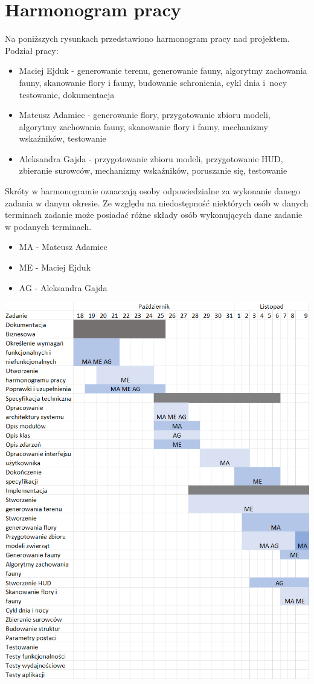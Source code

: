 \chapter{Harmonogram pracy}

Na poniższych rysunkach przedstawiono harmonogram pracy nad projektem. 
Podział pracy:
\begin{itemize}
    \item Maciej Ejduk - generowanie terenu, generowanie fauny, algorytmy zachowania fauny, skanowanie flory i fauny, budowanie schronienia, cykl dnia i~nocy testowanie, dokumentacja
    \item Mateusz Adamiec - generowanie flory, przygotowanie zbioru modeli, algorytmy zachowania fauny, skanowanie flory i fauny, mechanizmy wskaźników, testowanie
    \item Aleksandra Gajda - przygotowanie zbioru modeli, przygotowanie HUD, zbieranie surowców, mechanizmy wskaźników, poruszanie się, testowanie
\end{itemize}
Skróty w harmonogramie oznaczają osoby odpowiedzialne za wykonanie danego zadania w danym okresie. Ze względu na niedostępność niektórych osób w danych terminach zadanie może posiadać różne składy osób wykonujących dane zadanie w podanych terminach.
\begin{itemize}
    \item MA - Mateusz Adamiec
    \item ME - Maciej Ejduk
    \item AG - Aleksandra Gajda
\end{itemize}


\begin{center}
    \includegraphics[width=\textwidth]{Graphics/h1.png}
\end{center}

